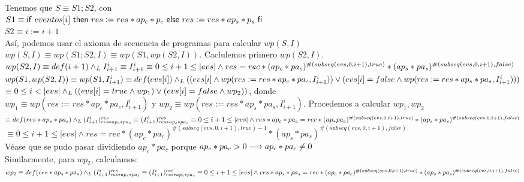 \documentclass[10pt,a4paper]{article}
\begin{document}
\begin{proof*}
    Tenemos que $S \equiv S1; S2$, con \\
    $S1 \equiv \mathsf{if}\ eventos[i]\ \mathsf{then}\ res:=res * ap_c * p_c\ \mathsf{else}\ res:=res*ap_s*p_s\ \mathsf{fi}$\\
    $S2 \equiv i:= i+1$\\
    Así, podemos usar el axioma de secuencia de programas para calcular $wp(S,I)$\\
	$wp(S, I) \equiv wp(S1; S2, I) \equiv wp(S1, wp(S2, I))$.
	Caclulemos primero $wp(S2, I)$. \\ 
	$wp(S2, I) \equiv def(i+1) \land _L I_{i+1}^i \\
    \equiv I_{i+1}^i \\
	\equiv 0 \leq i+1 \leq |evs| \wedge res = rec *  (ap_c * pa_c)^{\#(subseq(evs, 0, i+1), true)} * (ap_s * pa_s)^{\#(subseq(evs, 0, i+1), false)}$\\
	$wp(S1, wp(S2, I)) \equiv wp(S1, I_{i+1}^i) \equiv def(evs[i]) \land _L ((evs[i] \wedge wp(res:=res * ap_c * pa_c, I_{i+1}^i)) \vee (evs[i] = false \wedge wp(res:=res * ap_s * pa_s, I_{i+1}^i)) ) $\\
	$\equiv 0 \leq i < |evs| \land _L ((evs[i] = true \wedge wp_1) \vee (evs[i] = false \wedge wp_2))$, donde \\
	$wp_1 \equiv wp(res:= res* ap_c * pa_c, I_{i+1}^i)$ y $wp_2 \equiv wp(res:= res*ap_s *pa_s, I_{i+1}^i)$. 
	Procedemos a calcular $wp_1, wp_2$\\
	$\equiv def (res*ap_s*pa_s) \land _L (I_{i+1}^i)_{res*ap_c*pa_c}^{res} \\
 \equiv (I_{i+1}^i)_{res*ap_c*pa_c}^{res} \\
 \equiv 0\leq i+1 \leq |evs| \wedge res * ap_c * pa_c = rec *(ap_ * pa_c)^{\#(subseq(evs, 0, i+1), true)} * (ap_s * pa_s)^{\#(subseq(evs, 0, i+1), false)}$\\
	$\equiv 0\leq i+1 \leq |evs| \wedge res = rec *(ap_c * pa_c)^{\#(subseq(evs, 0, i+1), true) - 1} * (ap_s * pa_s)^{\#(subseq(evs, 0, i+1), false)}$\\
	Véase que se pudo pasar dividiendo $ap_c * pa_c$ porque $ap_c * pa_c > 0 \longrightarrow ap_c * pa_c \not= 0$ \\
	Similarmente, para $wp_2$, calculamos:
	$wp_2 \equiv def (res*ap_s*pa_s) \land _L (I_{i+1}^i)_{res*ap_s*pa_s}^{res} \\
 \equiv (I_{i+1}^i)_{res*ap_s*pa_s}^{res} \\
 \equiv 0\leq i+1 \leq |evs| \wedge res * ap_s * pa_s = rec *(ap_c * pa_c)^{\#(subseq(evs, 0, i+1), true)} * (ap_s * pa_s)^{\#(subseq(evs, 0, i+1), false)}$\\

\end{proof*}
\end{document}
